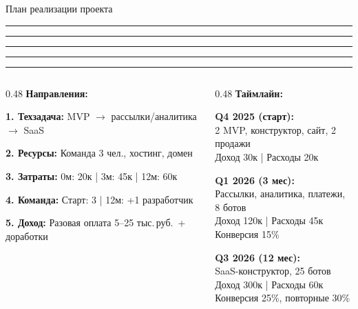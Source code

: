 \documentclass[aspectratio=169, 11pt]{beamer}
\newcommand{\cbar}{%
  \textcolor{cPink}{\rule{0.2\linewidth}{2pt}}%
  \textcolor{cPurple}{\rule{0.2\linewidth}{2pt}}%
  \textcolor{cRed}{\rule{0.2\linewidth}{2pt}}%
  \textcolor{cOrange}{\rule{0.2\linewidth}{2pt}}%
  \textcolor{cBlue}{\rule{0.2\linewidth}{2pt}}\par\medskip}
\newcommand{\R}{\,руб.}
\begin{document}
\begin{frame}{План реализации проекта}
\cbar
\begin{columns}[T]
\begin{column}{0.48\textwidth}
\textbf{Направления:}

\smallskip
{\small
\textbf{\textcolor{cGray}{1. Техзадача:}}
MVP $\to$ рассылки/аналитика $\to$ SaaS

\textbf{\textcolor{cGray}{2. Ресурсы:}}
Команда 3 чел., хостинг, домен

\textbf{\textcolor{cGray}{3. Затраты:}}
0м: 20к | 3м: 45к | 12м: 60к

\textbf{\textcolor{cGray}{4. Команда:}}
Старт: 3 | 12м: +1 разработчик

\textbf{\textcolor{cGray}{5. Доход:}}
Разовая оплата 5--25 тыс.\R\ + доработки
}
\end{column}
\begin{column}{0.48\textwidth}
\textbf{Таймлайн:}

\smallskip
{\small
\textbf{\textcolor{cOrange}{Q4 2025 (старт):}}\\
2 MVP, конструктор, сайт, 2 продажи\\
\textcolor{cRed}{Доход 30к | Расходы 20к}

\medskip
\textbf{\textcolor{cOrange}{Q1 2026 (3 мес):}}\\
Рассылки, аналитика, платежи, 8 ботов\\
\textcolor{cRed}{Доход 120к | Расходы 45к}\\
Конверсия 15\%

\medskip
\textbf{\textcolor{cOrange}{Q3 2026 (12 мес):}}\\
SaaS-конструктор, 25 ботов\\
\textcolor{cRed}{Доход 300к | Расходы 60к}\\
Конверсия 25\%, повторные 30\%
}
\end{column}
\end{columns}
\end{frame}
\end{document}
